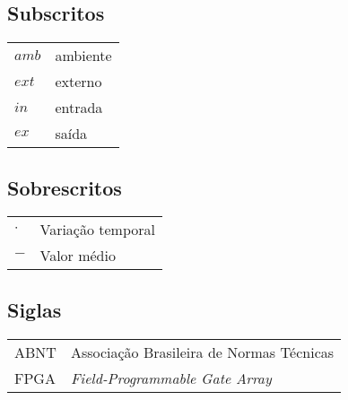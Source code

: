 \subsection*{Subscritos}

\begin{tabular}{p{}p{}}
$amb$	& ambiente \\
$ext$	& externo \\
$in$	& entrada \\
$ex$	& saída \\
\end{tabular}

\subsection*{Sobrescritos}

\begin{tabular}{p{}p{}}
$\cdot$	& Variação temporal \\
$-$	& Valor médio
\end{tabular}

\subsection*{Siglas}

\begin{tabular}{p{}p{}}
ABNT	& Associação Brasileira de Normas Técnicas\\
FPGA & \textit{Field-Programmable Gate Array}\\
\end{tabular}

